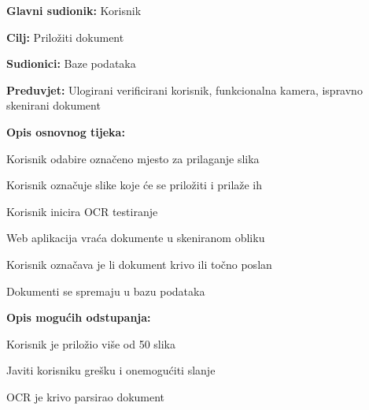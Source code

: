 				\noindent {}
				\begin{packed_item}
					
					\item \textbf{Glavni sudionik:} Korisnik
					\item  \textbf{Cilj:} Priložiti dokument
					\item  \textbf{Sudionici:} Baze podataka
					\item  \textbf{Preduvjet:} Ulogirani verificirani korisnik, funkcionalna kamera, ispravno skenirani dokument
					\item  \textbf{Opis osnovnog tijeka:}
					
					\item[] \begin{packed_enum}
						
						\item Korisnik odabire  označeno mjesto za prilaganje slika
						\item Korisnik označuje slike koje će se priložiti i prilaže ih
						\item Korisnik inicira OCR testiranje
						\item Web aplikacija vraća dokumente u skeniranom obliku
						\item Korisnik označava je li dokument krivo ili točno poslan
						\item Dokumenti se spremaju u bazu podataka 						\end{packed_enum}
					
					\item  \textbf{Opis mogućih odstupanja:}
					
					\item[] \begin{packed_item}
						
						\item[2.a] Korisnik je priložio više od 50 slika
						\item[] \begin{packed_enum}
							
							\item Javiti korisniku grešku i onemogućiti slanje
							\item OCR je krivo parsirao dokument
						\end{packed_enum}
						
					\end{packed_item}
				\end{packed_item}
				
